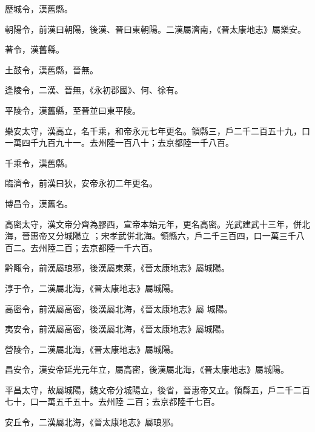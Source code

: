\begin{pinyinscope}
 歷城令，漢舊縣。



 朝陽令，前漢曰朝陽，後漢、晉曰東朝陽。二漢屬濟南，《晉太康地志》屬樂安。



 著令，漢舊縣。



 土鼓令，漢舊縣，晉無。



 逢陵令，二漢、晉無，《永初郡國》、何、徐有。



 平陵令，漢舊縣，至晉並曰東平陵。



 樂安太守，漢高立，名千乘，和帝永元七年更名。領縣三，戶二千二百五十九，口一萬四千九百九十一。去州陸一百八十；去京都陸一千八百。



 千乘令，漢舊縣。



 臨濟令，前漢曰狄，安帝永初二年更名。



 博昌令，漢舊名。


高密太守，漢文帝分齊為膠西，宣帝本始元年，更名高密。光武建武十三年，併北海，晉惠帝又分城陽立
 ；宋孝武併北海。領縣六，戶二千三百四，口一萬三千八百二。去州陸二百；去京都陸一千六百。



 黔陬令，前漢屬琅邪，後漢屬東萊，《晉太康地志》屬城陽。



 淳于令，二漢屬北海，《晉太康地志》屬城陽。



 高密令，前漢屬高密，後漢屬北海，《晉太康地志》屬
 城陽。



 夷安令，前漢屬高密，後漢屬北海，《晉太康地志》屬城陽。



 營陵令，二漢屬北海，《晉太康地志》屬城陽。



 昌安令，漢安帝延光元年立，屬高密，後漢屬北海，《晉太康地志》屬城陽。



 平昌太守，故屬城陽，魏文帝分城陽立，後省，晉惠帝又立。領縣五，戶二千二百七十，口一萬五千五十。去州陸
 二百；去京都陸千七百。



 安丘令，二漢屬北海，《晉太康地志》屬琅邪。




\end{pinyinscope}

